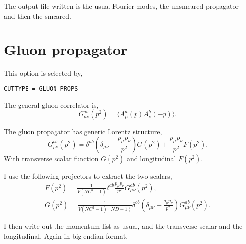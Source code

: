 \documentclass[12pt]{article}
\begin{document}
The output file written is the usual Fourier modes, the unsmeared propagator and then the smeared.

\section{Gluon propagator}

This option is selected by,
\begin{verbatim}
CUTTYPE = GLUON_PROPS
\end{verbatim}

The general gluon correlator is,
\begin{equation}
 G_{\mu\nu}^{ab}(p^2) = \langle A_{\mu}^a(p) A_{\nu}^b(-p)\rangle.
\end{equation}

The gluon propagator has generic Lorentz structure,
\begin{equation}
 G_{\mu\nu}^{ab}(p^2) = \delta^{ab}\left(\delta_{\mu\nu} - \frac{p_\mu p_\nu}{p^2}\right)G(p^2) + \frac{p_\mu p_\nu}{p^2}F(p^2).
\end{equation}
With transverse scalar function $G(p^2)$ and longitudinal $F(p^2)$.

I use the following projectors to extract the two scalars,
\begin{equation}
\begin{gathered}
 F(p^2) = \frac{1}{V\left( NC^2-1\right) }\delta^{ab}\frac{p_\mu p_\nu}{p^2} G_{\mu\nu}^{ab}(p^2), \\
 G(p^2) = \frac{1}{V \left( NC^2-1\right) \left( ND-1\right)} \delta^{ab} \left( \delta_{\mu\nu} - \frac{ p_\mu p_\nu }{ p^2 } \right)G_{\mu\nu}^{ab}(p^2).
\end{gathered}
\end{equation}

I then write out the momentum list as usual, and the transverse scalar and the longitudinal. Again in big-endian format.
\end{document}
